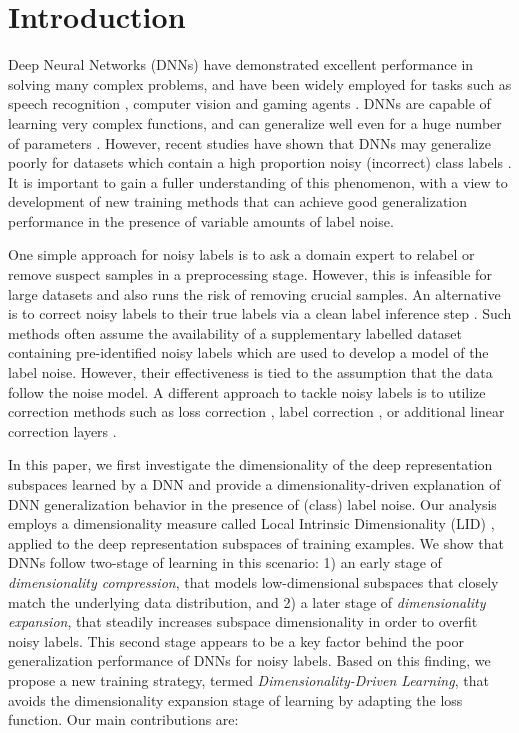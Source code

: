 \documentclass{article}
\begin{document}
\section{Introduction}
\label{sec:intro}
Deep Neural Networks (DNNs) have demonstrated excellent performance in solving many complex problems, and have been widely employed for tasks such as speech recognition \cite{hinton2012deep}, computer vision \cite{he2016deep} and gaming agents \cite{silver2016mastering}. DNNs are capable of learning very complex functions, and can generalize well even for a huge number of parameters \cite{neyshabur2014search}. However, recent studies have shown that DNNs may generalize poorly for datasets which contain a high proportion noisy (incorrect) class labels  \cite{zhang2016understanding}. It is important to gain a fuller understanding of this phenomenon, with a view to development of new training methods that can achieve good generalization performance in the presence of variable amounts of label noise.

One simple approach for noisy labels is to ask a domain expert to relabel or remove suspect samples in a preprocessing stage. However, this is infeasible for large datasets and also runs the risk of removing crucial samples.  An alternative is to correct noisy
labels to their true labels via a clean label inference step \cite{vahdat2017toward,veit2017learning,jiang2017mentornet,li2017learning}. Such methods often assume the availability of a supplementary labelled dataset containing pre-identified noisy labels which are used to develop a model of the label noise. However, their effectiveness is tied to the assumption that the data follow the noise model. A different approach to tackle noisy labels is to utilize correction methods such as loss correction \cite{patrini2017making,ghosh2017robust}, label correction \cite{reed2014training}, or additional linear correction layers \cite{sukhbaatar2014learning,goldberger2016training}.

In this paper, we first investigate the dimensionality of the deep representation subspaces learned by a DNN and provide a dimensionality-driven explanation of DNN generalization behavior in the presence of (class) label noise. Our analysis employs a dimensionality measure called Local Intrinsic Dimensionality (LID) \cite{houle13,houle2017local1}, applied to the deep representation subspaces of training examples. 
We show that DNNs follow two-stage of learning in this scenario: 1) an early stage of {\em dimensionality compression}, that models low-dimensional subspaces that closely match the underlying data distribution, and 2) a later stage of {\em dimensionality expansion}, that steadily increases subspace dimensionality in order to overfit noisy labels. This second stage appears to be a key factor behind the poor generalization performance of DNNs for noisy labels. Based on this finding, we propose a new training strategy, termed {\em Dimensionality-Driven Learning}, 
that avoids the dimensionality expansion stage of learning by adapting the loss function.   Our main contributions are: 
\end{document}
